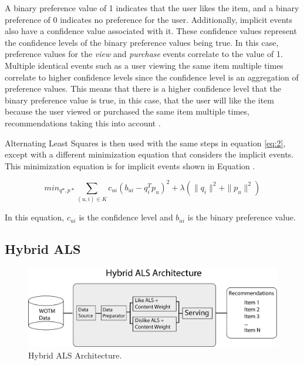 A binary preference value of 1 indicates that the user likes the item, and a binary preference of 0 indicates no preference for the user. Additionally, implicit events also have a confidence value associated with it. These confidence values represent the confidence levels of the binary preference values being true. In this case, preference values for the \textit{view} and \textit{purchase} events correlate to the value of 1. Multiple identical events such as a user viewing the same item multiple times correlate to higher confidence levels since the confidence level is an aggregation of preference values. This means that there is a higher confidence level that the binary preference value is true, in this case, that the user will like the item because the user viewed or purchased the same item multiple times, recommendations taking this into account . 

Alternating Least Squares is then used with the same steps in equation \ref{eq:2}, except with a different minimization equation that considers the implicit events. This minimization equation is for implicit events shown in Equation \cite{implicit}.

\begin{equation}\label{eq:3}\tag{3}
\displaystyle min_{q*,p*} \sum_{ (u,i) \in K} c_{ui}(b_{ui} - q_{i}^T p_{u})^2 + \lambda (\| q_{i} \|^2 + \| p_{u} \|^2 )
\end{equation}

In this equation, \begin{math} c_{ui} \end{math} is the confidence level and \begin{math} b_{ui} \end{math} is the binary preference value. 


\subsection{Hybrid ALS}

\begin{figure}
\centering
\includegraphics[scale=0.4]{recent_images/Hybrid_ALS_architecture.png}
\caption{Hybrid ALS Architecture.}
\label{fig:hybrid_architecture}
\end{figure}

